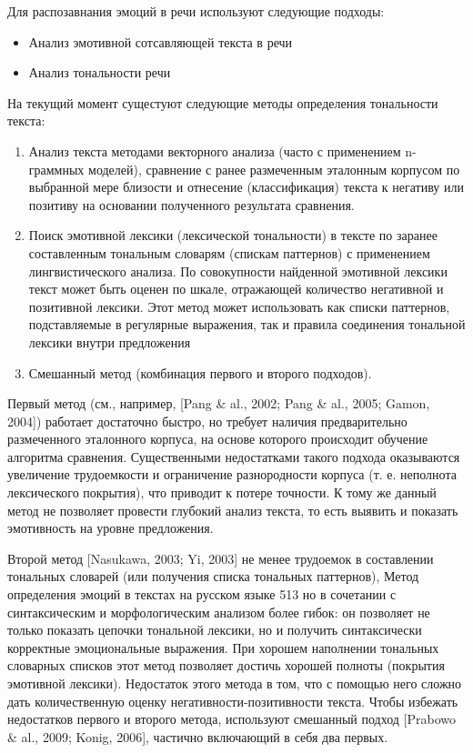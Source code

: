 Для распозавнания эмоций в речи используют следующие подходы:
\begin{itemize}
	\item Анализ эмотивной сотсавляющей текста в речи
	\item Анализ тональности речи
\end{itemize}


На текущий момент сущестуют следующие методы определения тональности текста:
\begin{enumerate}
  \item Анализ текста методами векторного анализа (часто с применением n-граммных моделей), сравнение с ранее размеченным эталонным корпусом по выбранной мере близости и отнесение (классификация) текста к негативу или позитиву на основании полученного результата сравнения.
  \item Поиск эмотивной лексики (лексической тональности) в тексте по заранее составленным тональным словарям (спискам паттернов) с применением лингвистического анализа. По совокупности найденной эмотивной лексики текст может быть оценен по шкале, отражающей количество негативной и позитивной лексики. Этот метод может использовать как списки паттернов, подставляемые в регулярные выражения, так и правила соединения тональной лексики внутри предложения
  \item Смешанный метод (комбинация первого и второго подходов).
\end{enumerate}

Первый метод (см., например, [Pang & al., 2002; Pang & al., 2005; Gamon,
2004]) работает достаточно быстро, но требует наличия предварительно размеченного эталонного корпуса, на основе которого происходит обучение алгоритма сравнения. 
Существенными недостатками такого подхода оказываются увеличение трудоемкости и ограничение разнородности корпуса (т. е.
неполнота лексического покрытия), что приводит к потере точности. К тому же
данный метод не позволяет провести глубокий анализ текста, то есть выявить
и показать эмотивность на уровне предложения.

Второй метод [Nasukawa, 2003; Yi, 2003] не менее трудоемок в составлении тональных словарей (или получения списка тональных паттернов),
Метод определения эмоций в текстах на русском языке 513
но в сочетании с синтаксическим и морфологическим анализом более гибок:
он позволяет не только показать цепочки тональной лексики, но и получить
синтаксически корректные эмоциональные выражения. При хорошем наполнении тональных словарных списков этот метод позволяет достичь хорошей
полноты (покрытия эмотивной лексики).
Недостаток этого метода в том, что с помощью него сложно дать количественную оценку негативности-позитивности текста. 
Чтобы избежать недостатков первого и второго метода, используют смешанный подход [Prabowo &
al., 2009; Konig, 2006], частично включающий в себя два первых.

